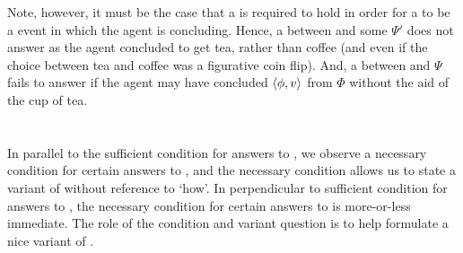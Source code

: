 \begin{note}
    Note, however, it must be the case that a \ros{} is required to hold in order for a \se{} to be a event in which the agent is concluding.
    Hence, a \ros{} between  and some \pool{} \(\Psi'\) does not answer \qWhyV{} as the agent concluded to get tea, rather than coffee (and even if the choice between tea and coffee was a figurative coin flip).
    And, a \ros{} between  and \(\Psi\) fails to answer \qWhyV{} if the agent may have concluded \(\langle \phi, v \rangle\) from \(\Phi\) without the aid of the cup of tea.
\end{note}



\section{\qHowV{}}
\label{cha:var:qhowv}


\begin{note}
  In parallel to the sufficient condition for answers to \qWhy{}, we observe a necessary condition for certain answers to \qHow{}, and the necessary condition allows us to state a variant of \qHow{} without reference to `how'.
  In perpendicular to sufficient condition for answers to \qWhy{}, the necessary condition for certain answers to \qHow{} is more-or-less immediate.
  The role of the condition and variant question is to help formulate a nice variant of \issueInclusion{}.
\end{note}




